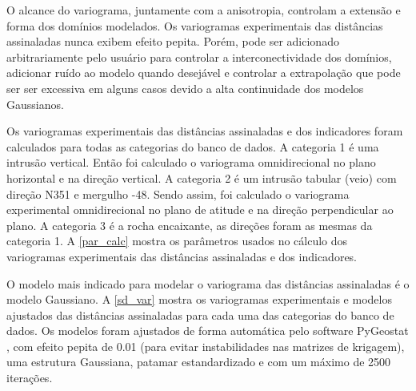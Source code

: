 O alcance do variograma, juntamente com a anisotropia, controlam a extensão e forma dos domínios modelados. Os variogramas experimentais das distâncias assinaladas nunca exibem efeito pepita. Porém, pode ser adicionado arbitrariamente pelo usuário para controlar a interconectividade dos domínios, adicionar ruído ao modelo quando desejável e controlar a extrapolação que pode ser ser excessiva em alguns casos devido a alta continuidade dos modelos Gaussianos.

Os variogramas experimentais das distâncias assinaladas e dos indicadores foram calculados para todas as categorias do banco de dados. A categoria 1 
é uma intrusão vertical. Então foi calculado o variograma omnidirecional no plano horizontal e na direção vertical. A categoria 2 é um intrusão tabular (veio) com direção N351 e mergulho -48. Sendo assim, foi calculado o variograma experimental omnidirecional no plano de atitude e na direção perpendicular ao plano. A categoria 3 é a rocha encaixante, as direções foram as mesmas da categoria 1. A \autoref{par_calc} mostra os parâmetros usados no cálculo dos variogramas experimentais das distâncias assinaladas e dos indicadores.

\begin{table}[H]
\centering
{}
\caption{Parâmetros de cálculo dos variogramas experimentais.} \label{par_calc}
\end{table}

O modelo mais indicado para modelar o variograma das distâncias assinaladas é o modelo Gaussiano. A \autoref{sd_var} mostra os variogramas experimentais e modelos ajustados das distâncias assinaladas para cada uma das categorias do banco de dados. Os modelos foram ajustados de forma automática pelo software PyGeostat \cite{pygeostat}, com efeito pepita de 0.01 (para evitar instabilidades nas matrizes de krigagem), uma estrutura Gaussiana, patamar estandardizado e com um máximo de 2500 iterações.  


